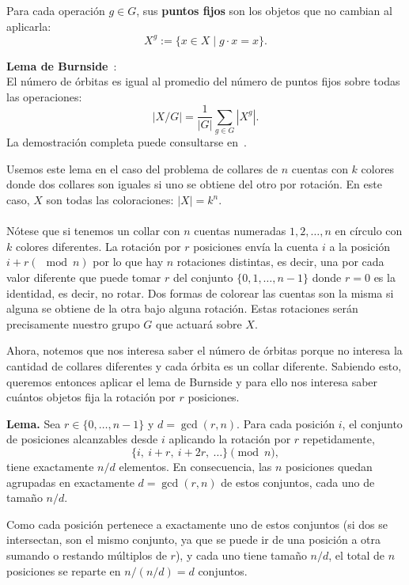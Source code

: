 Para cada operación $g \in G$, sus \textbf{puntos fijos} son los objetos que no cambian al aplicarla:
\[
X^g := \{x \in X \mid g \cdot x = x\}.
\]

\textbf{Lema de Burnside}~\cite{cf_burnside}:
\\El número de órbitas es igual al promedio del número de puntos fijos sobre todas las operaciones:
\[
|X/G| = \frac{1}{|G|} \sum_{g \in G} |X^g|.
\]
La demostración completa puede consultarse en~\cite{youkn0wwho_burnside}.

Usemos este lema en el caso del problema de collares de $n$ cuentas con $k$ colores donde dos collares son iguales si uno se obtiene del otro por rotación. En este caso, $X$ son todas las coloraciones: $|X| = k^n$.
\\\\Nótese que si tenemos un collar con $n$ cuentas numeradas $1,2,\dots, n$ en círculo con $k$ colores diferentes. La rotación por $r$ posiciones envía la cuenta $i$ a la posición $i+r (\mod n)$ por lo que hay $n$ rotaciones distintas, es decir, una por cada valor diferente que puede tomar $r$ del conjunto $\{0,1,\dots, n-1\}$ donde $r=0$ es la identidad, es decir, no rotar. Dos formas de colorear las cuentas son la misma si alguna se obtiene de la otra bajo alguna rotación. Estas rotaciones serán precisamente nuestro grupo $G$ que actuará sobre $X$.

Ahora, notemos que nos interesa saber el número de órbitas porque no interesa la cantidad de collares diferentes y cada órbita es un collar diferente. Sabiendo esto, queremos entonces aplicar el lema de Burnside y para ello nos interesa saber cuántos objetos fija la rotación por $r$ posiciones.

\textbf{Lema.} Sea $r \in \{0,\dots,n-1\}$ y $d = \gcd(r,n)$. Para cada posición $i$, el conjunto de posiciones alcanzables desde $i$ aplicando la rotación por $r$ repetidamente,
\[
\{i,\ i+r,\ i+2r,\ \dots\} \pmod n,
\]
tiene exactamente $n/d$ elementos. En consecuencia, las $n$ posiciones quedan agrupadas en exactamente $d = \gcd(r,n)$ de estos conjuntos, cada uno de tamaño $n/d$.

Como cada posición pertenece a exactamente uno de estos conjuntos (si dos se intersectan, son el mismo conjunto, ya que se puede ir de una posición a otra sumando o restando múltiplos de $r$), y cada uno tiene tamaño $n/d$, el total de $n$ posiciones se reparte en $n / (n/d) = d$ conjuntos.

